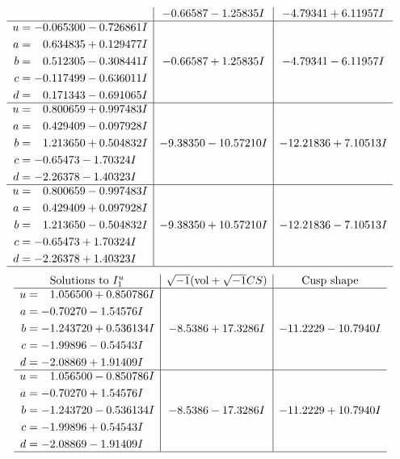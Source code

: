 \documentclass[1p]{elsarticle_modified}
\theoremstyle{definition}
\newcommand{\I}{\sqrt{-1}}
\begin{document}
$$\begin{array}{c|c|c}
 & -0.66587 - 1.25835 I & -4.79341 + 6.11957 I \\ \hline\begin{aligned}
u &= -0.065300 - 0.726861 I \\
a &= \phantom{-}0.634835 + 0.129477 I \\
b &= \phantom{-}0.512305 - 0.308441 I \\
c &= -0.117499 - 0.636011 I \\
d &= \phantom{-}0.171343 - 0.691065 I\end{aligned}
 & -0.66587 + 1.25835 I & -4.79341 - 6.11957 I \\ \hline\begin{aligned}
u &= \phantom{-}0.800659 + 0.997483 I \\
a &= \phantom{-}0.429409 - 0.097928 I \\
b &= \phantom{-}1.213650 + 0.504832 I \\
c &= -0.65473 - 1.70324 I \\
d &= -2.26378 - 1.40323 I\end{aligned}
 & -9.38350 - 10.57210 I & -12.21836 + 7.10513 I \\ \hline\begin{aligned}
u &= \phantom{-}0.800659 - 0.997483 I \\
a &= \phantom{-}0.429409 + 0.097928 I \\
b &= \phantom{-}1.213650 - 0.504832 I \\
c &= -0.65473 + 1.70324 I \\
d &= -2.26378 + 1.40323 I\end{aligned}
 & -9.38350 + 10.57210 I & -12.21836 - 7.10513 I\\
 \hline 
 \end{array}$$\newpage$$\begin{array}{c|c|c}  
\text{Solutions to }I^u_{1}& \I (\text{vol} + \sqrt{-1}CS) & \text{Cusp shape}\\
 \hline 
\begin{aligned}
u &= \phantom{-}1.056500 + 0.850786 I \\
a &= -0.70270 - 1.54576 I \\
b &= -1.243720 + 0.536134 I \\
c &= -1.99896 - 0.54543 I \\
d &= -2.08869 + 1.91409 I\end{aligned}
 & -8.5386 + 17.3286 I & -11.2229 - 10.7940 I \\ \hline\begin{aligned}
u &= \phantom{-}1.056500 - 0.850786 I \\
a &= -0.70270 + 1.54576 I \\
b &= -1.243720 - 0.536134 I \\
c &= -1.99896 + 0.54543 I \\
d &= -2.08869 - 1.91409 I\end{aligned}
 & -8.5386 - 17.3286 I & -11.2229 + 10.7940 I\\
 \hline 
 \end{array}$$\newpage\newpage\renewcommand{\arraystretch}{1}
\end{document}

